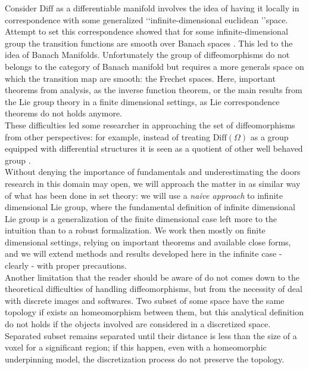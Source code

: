 Consider $\text{Diff}$ as a differentiable manifold involves the idea of having it locally in correspondence with some generalized \lq\lq infinite-dimensional euclidean \rq\rq space. Attempt to set this correspondence showed that for some infinite-dimensional group the transition functions are smooth over Banach spaces \cite{khesin2008geometry}. This led to the idea of Banach Manifolds. Unfortunately the group of diffeomorphisms do not belongs to the category of Banach manifold but requires a more generals space on which the transition map are smooth: the Frechet spaces. Here, important theorems from analysis, as the inverse function theorem, or the main results from the Lie group theory in a finite dimensional settings, as Lie correspondence theorems do not holds anymore.\\
These difficulties led some researcher in approaching the set of diffeomorphisms from other perspectives: 
for example, instead of treating $\text{Diff}(\Omega)$ as a group equipped with differential structures it is seen as a quotient of other well behaved group \cite{wojtynski1994one}.\\
Without denying the importance of fundamentals and underestimating the doors research in this domain may open, we will approach the matter in as similar way of what has been done in set theory: we will use a \emph{naive approach} to infinite dimensional Lie group, where the fundamental definition of infinite dimensional Lie group is a generalization of the finite dimensional case left more to the intuition than to a robust formalization. 
We work then mostly on finite dimensional settings, relying on important theorems and available close forms, and we will extend methods and results developed here in the infinite case -clearly - with proper precautions.\\

Another limitation that the reader should be aware of do not comes down to the theoretical difficulties of handling diffeomorphisms, but from the necessity of deal with discrete images and softwares. Two subset of some space have the same topology if exists an homeomorphism between them, but this analytical definition do not holds if the objects involved are considered in a discretized space. Separated subset remains separated until their distance is less than the size of a voxel for a significant region; if this happen, even with a homeomorphic underpinning model, the discretization process do not preserve the topology.\\

